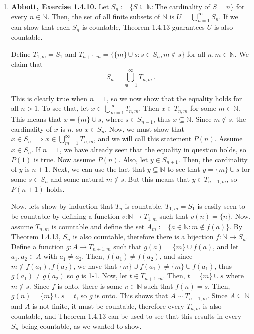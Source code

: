 \documentclass{article}
\newcommand{\N}{\mathbb{N}}
\newcommand{\exc}[2][Abbott]{\item \textbf{#1, Exercise #2.}}
\begin{document}
\begin{enumerate}
	\exc{1.4.10}
	Let $S_n := \{S \subseteq \N : \text{The cardinality of } S = n\}$ for every $n \in \N$. Then, the set of all finite subsets of $\N$ is $U = \bigcup_{n=1}^\infty S_n$. If we can show that each $S_n$ is countable, Theorem 1.4.13 guarantees $U$ is also countable.
				      	          
	Define $T_{1,m} = S_1$ and $T_{n+1,m} = \{\{m\} \cup s : s \in S_n, m \notin s\}$ for all $n, m \in \N$. We claim that \begin{equation*}
	S_n = \bigcup_{m=1}^{\infty} T_{n,m} \, .
	\end{equation*}
					    
	This is clearly true when $n = 1$, so we now show that the equality holds for all $n > 1$. To see that, let $x \in \bigcup_{m=1}^{\infty} T_{n,m}$. Then $x \in T_{n, m}$ for some $m \in \N$. This means that $x = \{m\} \cup s$, where $s \in S_{n-1}$, thus $x \subseteq \N$. Since $m \notin s$, the cardinality of $x$ is $n$, so $x \in S_n$. Now, we must show that $x \in S_n \implies x \in \bigcup_{m=1}^{\infty} T_{n,m}$, and we will call this statement $P(n)$. Assume $x \in S_n$. If $n = 1$, we have already seen that the equality in question holds, so $P(1)$ is true. Now assume $P(n)$. Also, let $y \in S_{n+1}$. Then, the cardinality of $y$ is $n+1$. Next, we can use the fact that $y \subseteq \N$ to see that $y = \{m\} \cup s$ for some $s \in S_n$ and some natural $m \notin s$. But this means that $y \in T_{n+1, m}$, so $P(n+1)$ holds.
					    
	Now, lets show by induction that $T_n$ is countable. $T_{1,m} = S_1$ is easily seen to be countable by defining a function $v : \N \rightarrow T_{1,m} $ such that $v(n) = \{n\}$. Now, assume $T_{n,m}$ is countable and define the set $A_m := \{a \in \N : m \notin f(a)\}$. By Theorem 1.4.13, $S_n$ is also countable, therefore there is a bijection $f : \N \rightarrow S_n$. Define a function $g : A\rightarrow T_{n+1, m}$ such that $g(a) = \{m\} \cup f(a)$, and let $a_1, a_2 \in A$ with $a_1 \neq a_2$. Then, $f(a_1) \neq f(a_2)$, and since $m \notin f(a_1), f(a_2)$, we have that $\{m\} \cup f(a_1) \neq \{m\} \cup f(a_1)$, thus $g(a_1) \neq g(a_2)$ so $g$ is 1-1. Now, let $t \in T_{n+1, m}$. Then, $t = \{m\} \cup s$ where $m \notin s$. Since $f$ is onto, there is some $n \in \N$ such that $f(n) = s$. Then, $g(n) = \{m\} \cup s = t$, so $g$ is onto. This shows that $A \sim T_{n+1, m}$. Since $A \subseteq \N$ and $A$ is not finite, it must be countable, therefore every $T_{n, m}$ is also countable, and Theorem 1.4.13 can be used to see that this results in every $S_n$ being countable, as we wanted to show.
					    

\end{enumerate}
\end{document}

